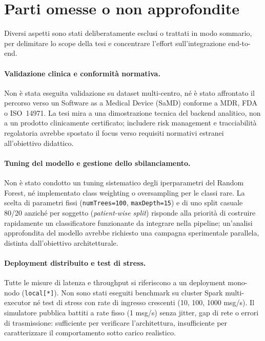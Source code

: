 \section{Parti omesse o non approfondite}\label{sec:parti-omesse}

Diversi aspetti sono stati deliberatamente esclusi o trattati in modo sommario, per delimitare lo scope della tesi e concentrare l'effort sull'integrazione end-to-end.

\paragraph{Validazione clinica e conformità normativa.}
Non è stata eseguita validazione su dataset multi-centro, né è stato affrontato il percorso verso un Software as a Medical Device (SaMD) conforme a MDR, FDA o ISO~14971.
La tesi mira a una dimostrazione tecnica del backend analitico, non a un prodotto clinicamente certificato; includere risk management e tracciabilità regolatoria avrebbe spostato il focus verso requisiti normativi estranei all'obiettivo didattico.

\paragraph{Tuning del modello e gestione dello sbilanciamento.}
Non è stato condotto un tuning sistematico degli iperparametri del Random Forest, né implementato class weighting o oversampling per le classi rare.
La scelta di parametri fissi (\texttt{numTrees=100}, \texttt{maxDepth=15}) e di uno split casuale 80/20 anziché per soggetto (\emph{patient-wise split}) risponde alla priorità di costruire rapidamente un classificatore funzionante da integrare nella pipeline; un'analisi approfondita del modello avrebbe richiesto una campagna sperimentale parallela, distinta dall'obiettivo architetturale.

\paragraph{Deployment distribuito e test di stress.}
Tutte le misure di latenza e throughput si riferiscono a un deployment mono-nodo (\texttt{local[*]}).
Non sono stati eseguiti benchmark su cluster Spark multi-executor né test di stress con rate di ingresso crescenti (10, 100, 1000 msg/s).
Il simulatore pubblica battiti a rate fisso (1 msg/s) senza jitter, gap di rete o errori di trasmissione: sufficiente per verificare l'architettura, insufficiente per caratterizzare il comportamento sotto carico realistico.

